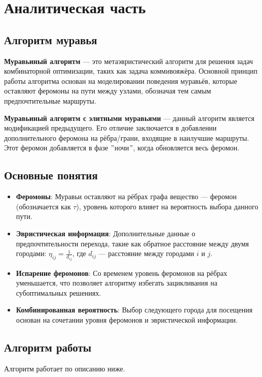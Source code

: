 \chapter{Аналитическая часть}

\section{Алгоритм муравья}
\textbf{Муравьиный алгоритм} --- это метаэвристический алгоритм для решения задач комбинаторной оптимизации, таких как задача коммивояжёра. Основной принцип работы алгоритма основан на моделировании поведения муравьёв, которые оставляют феромоны на пути между узлами, обозначая тем самым предпочтительные маршруты.

\textbf{Муравьиный алгоритм с элитными муравьями} --- данный алгоритм является модификацией предыдущего. Его отличие заключается в добавлении дополнительного феромона на рёбра/грани, входящие в наилучшие маршруты. Этот феромон добавляется в фазе $"$ночи$"$, когда обновляется весь феромон.

\section{Основные понятия}

\begin{itemize}
	\item \textbf{Феромоны}: Муравьи оставляют на рёбрах графа вещество --- феромон (обозначается как $\tau$), уровень которого влияет на вероятность выбора данного пути.
	\item \textbf{Эвристическая информация}: Дополнительные данные о предпочтительности перехода, такие как обратное расстояние между двумя городами: $\eta_{ij} = \frac{1}{d_{ij}}$, где $d_{ij}$ --- расстояние между городами $i$ и $j$.
	\item \textbf{Испарение феромонов}: Со временем уровень феромонов на рёбрах уменьшается, что позволяет алгоритму избегать зацикливания на субоптимальных решениях.
	\item \textbf{Комбинированная вероятность}: Выбор следующего города для посещения основан на сочетании уровня феромонов и эвристической информации.
\end{itemize}

\section{Алгоритм работы}

Алгоритм работает по описанию ниже.

